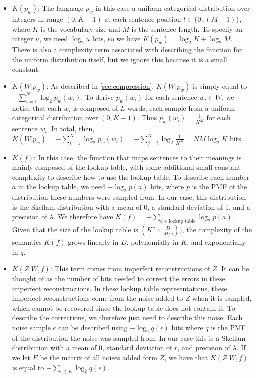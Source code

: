 \documentclass{article} %
\begin{document}
\begin{appendices}
\begin{itemize}
    \item $K(p_w)$: The language $p_w$ in this case a uniform categorical distribution over integers in range $(0, K-1)$ at each sentence position $l \in \{0..(M-1)\}$, where $K$ is the vocabulary size and $M$ is the sentence length. To specify an integer $u$, we need $\log_2 u$ bits, so we have $K(p_w) = \log_2 K + \log_2 M$. There is also a complexity term associated with describing the function for the uniform distribution itself, but we ignore this because it is a small constant.
    
    \item $K(W|p_w)$: As described in \cref{sec:compression}, $K(W|p_w)$ is simply equal to $-\sum_{i=1}^{N} \log_2 p_w(w_i)$. To derive $p_w(w_i)$ for each sentence $w_i \in W$, we notice that each $w_i$ is composed of $L$ words, each sample from a uniform categorical distribution over $(0, K-1)$. Thus $p_w(w_i) = \frac{1}{K^M}$ for each sentence $w_i$. In total, then, $K(W|p_w) = -\sum_{i=1}^N \log_2 p_w(w_i) = -\sum_{j=i}^N \log_2 \frac{1}{K^M} = NM\log_2 K$ bits.
    
    \item $K(f)$: In this case, the function that maps sentences to their meanings is mainly composed of the lookup table, with some additional small constant complexity to describe how to use the lookup table. To describe each number $a$ in the lookup table, we need $-\log_2 p(a)$ bits, where $p$ is the PMF of the distribution these numbers were sampled from. In our case, this distribution is the Skellam distribution with a mean of 0, a standard deviation of 1, and a precision of $\lambda$. We therefore have $K(f) = -\sum_{a \in \text{lookup table}} \log_2 p(a)$. Given that the size of the lookup table is $(K^q \times \frac{D}{M / q}))$, the complexity of the semantics $K(f)$ grows linearly in $D$, polynomially in $K$, and exponentially in $q$.
    
    \item $K(Z|W,f)$: This term comes from imperfect reconstructions of $Z$. It can be thought of as the number of bits needed to correct the errors in these imperfect reconstructions. In these lookup table representations, these imperfect reconstructions come from the noise added to $Z$ when it is sampled, which cannot be recovered since the lookup table does not contain it. To describe the corrections, we therefore just need to describe this noise. Each noise sample $\epsilon$ can be described using $-\log_2 q(\epsilon)$ bits where $q$ is the PMF of the distribution the noise was sampled from. In our case this is a Skellam distribution with a mean of 0, standard deviation of $r$, and precision of $\lambda$. If we let $E$ be the matrix of all noises added form $Z$, we have that $K(Z|W,f)$ is equal to $-\sum_{\epsilon \in E} \log_2 q(\epsilon)$.
\end{itemize}


\end{appendices}
\end{document}
